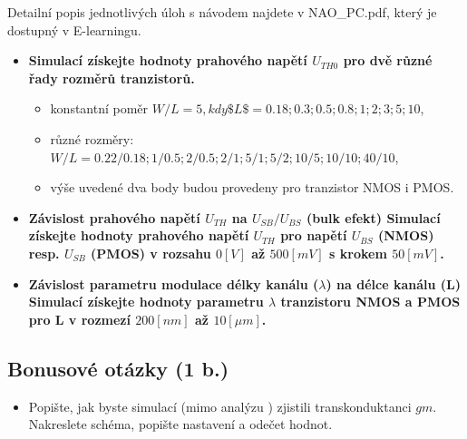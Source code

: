 Detailní popis jednotlivých úloh s návodem najdete v NAO\_PC.pdf, který je dostupný v E-learningu.

\begin{itemize}
    \item {\bf Simulací získejte hodnoty prahového napětí \(U_{TH0}\) pro dvě různé řady rozměrů tranzistorů.}
    \begin{itemize}
        \item konstantní poměr \(W/L = 5, kdy \$L\$ = 0.18; 0.3; 0.5; 0.8; 1; 2; 3; 5; 10\),
        \item různé rozměry: \(W/L = 0.22/0.18; 1/0.5; 2/0.5; 2/1; 5/1; 5/2; 10/5; 10/10; 40/10\),
        \item výše uvedené dva body budou provedeny pro tranzistor NMOS i PMOS.
    \end{itemize}
    \item {\bf Závislost prahového napětí \(U_{TH}\) na \(U_{SB}/U_{BS}\) (bulk efekt) Simulací získejte hodnoty prahového napětí \(U_{TH}\) pro napětí \(U_{BS}\) (NMOS) resp. \(U_{SB}\) (PMOS) v rozsahu \(0 [V]\) až \(500 [mV]\) s krokem \(50 [mV]\).}
    \item {\bf Závislost parametru modulace délky kanálu (\(\lambda\)) na délce kanálu (L) Simulací získejte hodnoty parametru \(\lambda\) tranzistoru NMOS a PMOS pro L v rozmezí \(200 [nm]\) až \(10 [\mu m]\).}
\end{itemize}

\subsection*{Bonusové otázky (1 b.)}
\begin{itemize}
    \item Popište, jak byste simulací (mimo analýzu ) zjistili transkonduktanci \(gm\).
          Nakreslete schéma, popište nastavení a odečet hodnot.
\end{itemize}
